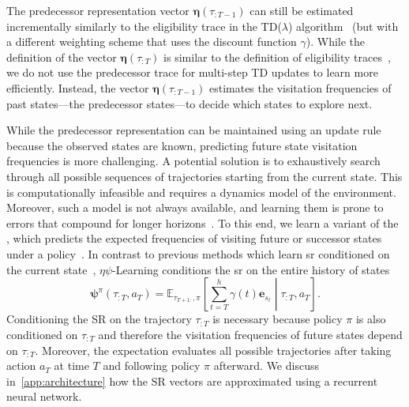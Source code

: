 \documentclass{article}
\theoremstyle{plain}
\theoremstyle{definition}
\theoremstyle{remark}
\newcommand{\alg}{$\eta$$\psi$-Learning}
\begin{document}
The predecessor representation vector $\pmb{\eta}(\tau_{:T-1})$ can still be estimated incrementally similarly to the eligibility trace in the TD($\lambda$) algorithm~\cite{sutton1988learning} (but with a different weighting scheme that uses the discount function $\gamma$).
While the definition of the vector $\pmb{\eta} (\tau_{:T})$ is similar to the definition of eligibility traces~\citep[Chapter 12]{sutton2018reinforcement}, we do not use the predecessor trace for multi-step TD updates to learn more efficiently.
Instead, the vector $\pmb{\eta}(\tau_{:T-1})$ estimates the visitation frequencies of past states---the predecessor states---to decide which states to explore next.

While the predecessor representation can be maintained using an update rule because the observed states are known, predicting future state visitation frequencies is more challenging.  
A potential solution is to exhaustively search through all possible sequences of trajectories starting from the current state.
This is computationally infeasible and requires a dynamics model of the environment.
Moreover, such a model is not always available, and learning them is prone to errors that compound for longer horizons~\cite{ross2011reduction,janner2019trust}.
To this end, we learn a variant of the , which predicts the expected frequencies of visiting future or successor states under a policy~\cite{dayan1993improving}. 
In contrast to previous methods which learn \gls{sr} conditioned on the current state~\cite{dayan1993improving, barreto2017successor}, \alg{} conditions the \gls{sr} on the entire history of states
\begin{equation}
    \pmb{\psi}^\pi( \tau_{:T}, a_T ) = \mathbb{E}_{\tau_{T+1:}, \pi} \left[  \sum_{t=T}^h\gamma(t) \pmb{e}_{s_t} \middle| \tau_{:T},a_T \right]. \label{eq:successor_representation}
\end{equation}
Conditioning the SR on the trajectory $\tau_{:T}$ is necessary because policy $\pi$ is also conditioned on $\tau_{:T}$ and therefore the visitation frequencies of future states depend on $\tau_{:T}$. 
Moreover, the expectation evaluates all possible trajectories after taking action $a_T$ at time $T$ and following policy $\pi$ afterward. 
We discuss in~\autoref{app:architecture}
how the SR vectors are approximated using a recurrent neural network.
\end{document}
